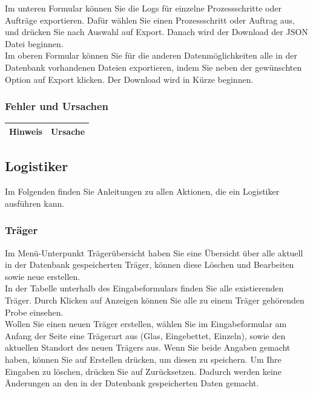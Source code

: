 \documentclass[enabledeprecatedfontcommands,fontsize=12pt,paper=a4,twoside]{scrartcl}
\begin{document}
Im unteren Formular können Sie die Logs für einzelne Prozessschritte oder Aufträge exportieren. Dafür wählen Sie einen Prozessschritt oder Auftrag aus, und drücken Sie nach Auswahl auf Export. Danach wird der Download der JSON Datei beginnen. \\

Im oberen Formular können Sie für die anderen Datenmöglichkeiten alle in der Datenbank vorhandenen Dateien exportieren, indem Sie neben der gewünschten Option auf Export klicken. Der Download wird in Kürze beginnen. \\

\subsubsection{Fehler und Ursachen}
\begin{longtable}[c]{|p{5cm}|p{10cm}|}
\hline
\multicolumn{1}{|c|}{\textbf{Hinweis}}                          & \multicolumn{1}{c|}{\textbf{Ursache}}                                                                                                                                                                                                               \\ \hline
\endhead

\end{longtable}
\subsection{Logistiker}

Im Folgenden finden Sie Anleitungen zu allen Aktionen, die ein Logistiker ausführen kann. \\

\subsubsection{Träger}
Im Menü-Unterpunkt Trägerübersicht haben Sie eine Übersicht über alle aktuell in der Datenbank gespeicherten Träger, können diese Löschen und Bearbeiten sowie neue erstellen. \\

In der Tabelle unterhalb des Eingabeformulars finden Sie alle existierenden Träger. Durch Klicken auf Anzeigen können Sie alle zu einem Träger gehörenden Probe einsehen. \\

Wollen Sie einen neuen Träger erstellen, wählen Sie im Eingabeformular am Anfang der Seite eine Trägerart aus (Glas, Eingebettet, Einzeln), sowie den aktuellen Standort des neuen Trägers aus. Wenn Sie beide Angaben gemacht haben, können Sie auf Erstellen drücken, um diesen zu speichern. Um Ihre Eingaben zu löschen, drücken Sie auf Zurücksetzen. Dadurch werden keine Änderungen an den in der Datenbank gespeicherten Daten gemacht. \\
\end{document}
